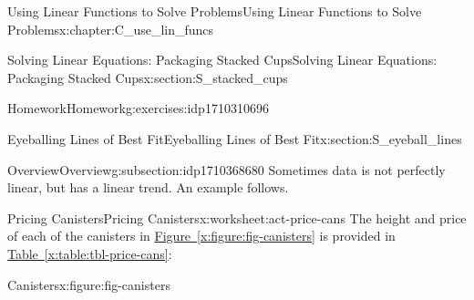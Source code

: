 \documentclass[oneside,10pt,]{book}
\newcommand{\xreffont}{\relax}
\numberwithin{equation}{chapter}
\begin{document}
\begin{chapterptx}{Using Linear Functions to Solve Problems}{}{Using Linear Functions to Solve Problems}{}{}{x:chapter:C_use_lin_funcs}
\begin{sectionptx}{Solving Linear Equations: Packaging Stacked Cups}{}{Solving Linear Equations: Packaging Stacked Cups}{}{}{x:section:S_stacked_cups}
\begin{exercises-subsection}{Homework}{}{Homework}{}{}{g:exercises:idp1710310696}
\end{exercises-subsection}
\end{sectionptx}
%
%
\typeout{************************************************}
\typeout{************************************************}
%
\begin{sectionptx}{Eyeballing Lines of Best Fit}{}{Eyeballing Lines of Best Fit}{}{}{x:section:S_eyeball_lines}
%
%
\typeout{************************************************}
\typeout{************************************************}
%
\begin{subsectionptx}{Overview}{}{Overview}{}{}{g:subsection:idp1710368680}
Sometimes data is not perfectly linear, but has a linear trend. An example follows.%
\end{subsectionptx}
%
%
\typeout{************************************************}
\typeout{************************************************}
%
\begin{worksheet-subsection}{Pricing Canisters}{}{Pricing Canisters}{}{}{x:worksheet:act-price-cans}
The height and price of each of the canisters in \hyperref[x:figure:fig-canisters]{Figure~{\xreffont\ref{x:figure:fig-canisters}}} is provided in \hyperref[x:table:tbl-price-cans]{Table~{\xreffont\ref{x:table:tbl-price-cans}}}:%
\begin{sidebyside}{2}{0}{0}{0}%
\begin{sbspanel}{0.5}%
\begin{figureptx}{Canisters}{x:figure:fig-canisters}{}%

\end{figureptx}
\end{sbspanel}
\end{sidebyside}
\end{worksheet-subsection}
\end{sectionptx}
\end{chapterptx}
\end{document}
